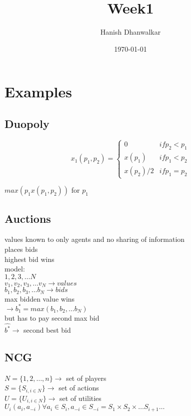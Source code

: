 \documentclass{article}
\title{Week1}
\author{Hanish Dhanwalkar}
\date{\today}
\begin{document}
\maketitle

\section{Examples}

\subsection{Duopoly}
\[ 
x_1(p_1, p_2)= \left\{
  \begin{array}{lr} 
    0 & if p_2 < p_1 \\
    x(p_1) & if p_1 < p_2 \\
    x(p_2)/2 & if p_1 = p_2
    \end{array}
\right.
\]

$max(p_1 x(p_1, p_2))$ for $p_1$

\subsection{Auctions}
values known to only agents and no sharing of information\\
places bids \\
highest bid wins \\

model: \\
$1, 2, 3, \dots N$ \\
$v_1, v_2, v_3, \dots v_N \rightarrow values $\\
$b_1, b_2, b_3, \dots b_N \rightarrow bids $\\

max bidden value wins\\
$\rightarrow b^*_1 = max(b_1, b_2, \dots b_N)$\\ 

but has to pay second max bid\\
$\hat{b^*} \rightarrow$ second best bid\\

\subsection{NCG}
$N =\{1, 2, \dots, n\}\rightarrow$ set of players \\
$S = \{S_{i, i\in N}\}\rightarrow$ set of actions \\
$U = \{U_{i, i\in N}\}\rightarrow$ set of utilities \\
$U_i(a_i, a_{-i}) \forall a_i \in S_i, a_{-i} \in S_{-i} = S_1 \times S_2 \times \dots S_{i+1} \dots$\\
\end{document}
